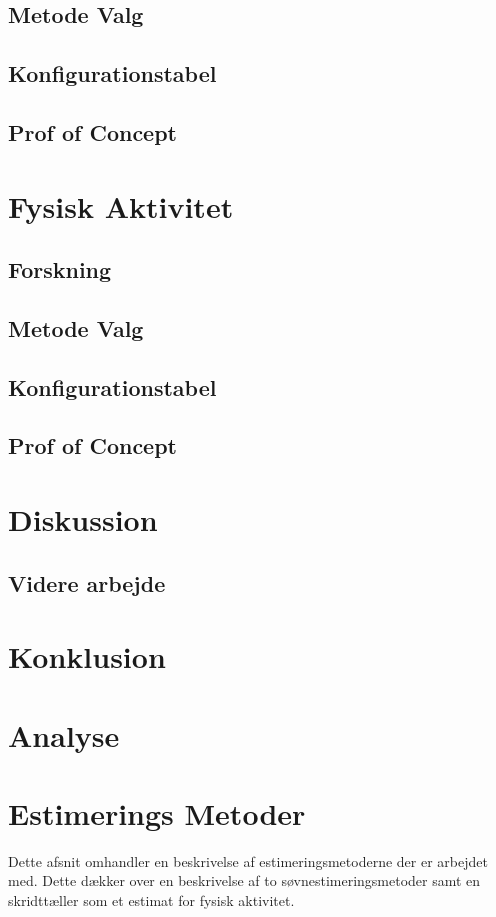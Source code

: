 \section{Metode Valg}
\section{Konfigurationstabel}
\section{Prof of Concept}

\chapter{Fysisk Aktivitet}
\section{Forskning}
\section{Metode Valg}
\section{Konfigurationstabel}
\section{Prof of Concept}

\chapter{Diskussion}
\section{Videre arbejde}
\chapter{Konklusion}


\iffalse

\chapter{Analyse}





\chapter{Estimerings Metoder}
Dette afsnit omhandler en beskrivelse af estimeringsmetoderne der er arbejdet med.
Dette dækker over en beskrivelse af to søvnestimeringsmetoder samt en skridttæller som et estimat for fysisk aktivitet.

